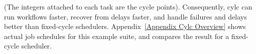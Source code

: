 (The integers attached to each task are the cycle points). Consequently, cylc can
run workflows faster, recover from delays faster, and handle failures and
delays better than fixed-cycle schedulers.  Appendix~\ref{Appendix Cylc
Overview} shows actual job schedules for this example suite, and compares the
result for a fixed-cycle scheduler.
